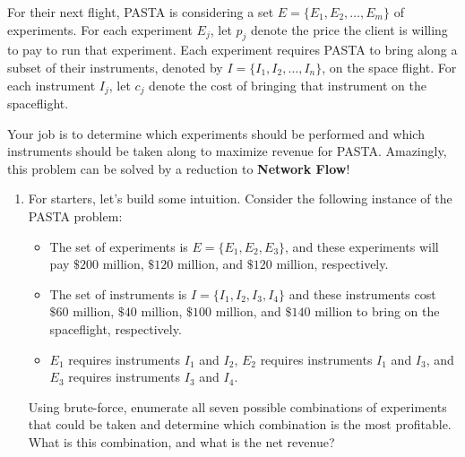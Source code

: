 \documentclass[12 pt, letterpaper]{hmcpset}
\begin{document}
\pagebreak

\begin{problem}
	    For their next flight, PASTA is considering a set $E = \{ E_{1}, E_{2}, \ldots, E_{m} \}$ of experiments. For each experiment $E_{j}$, let $p_j$ denote the price the client is willing to pay to run that experiment. Each experiment requires PASTA to bring along a subset of their instruments, denoted by $I = \{I_{1}, I_{2}, \ldots, I_{n}\}$, on the space flight. For each instrument $I_{j}$, let $c_j$ denote the cost of bringing that instrument on the spaceflight.

    Your job is to determine which experiments should be performed and which instruments should be taken along to maximize revenue for PASTA. Amazingly, this problem can be solved by a reduction to \textbf{Network Flow}!
    
    \begin{enumerate}
        \item For starters, let's build some intuition. Consider the following instance of the PASTA problem:
        \begin{itemize}
            \item The set of experiments is $E = \{E_1, E_2, E_3\}$, and these experiments will pay $\$200$ million, $\$120$ million, and $\$120$ million, respectively.
            \item The set of instruments is $I = \{I_1, I_2, I_3, I_4\}$ and these instruments cost $\$60$ million, $\$40$ million, $\$100$ million, and $\$140$ million to bring on the spaceflight, respectively.
            \item $E_{1}$ requires instruments $I_{1}$ and $I_{2}$, $E_{2}$ requires instruments $I_{1}$ and $I_{3}$, and $E_{3}$ requires instruments $I_{3}$ and $I_{4}$.
        \end{itemize}
        Using brute-force, enumerate all seven possible combinations of experiments that could be taken and determine which combination is the most profitable.  What is this combination, and what is the net revenue?


\end{enumerate}
\end{problem}
\end{document}
